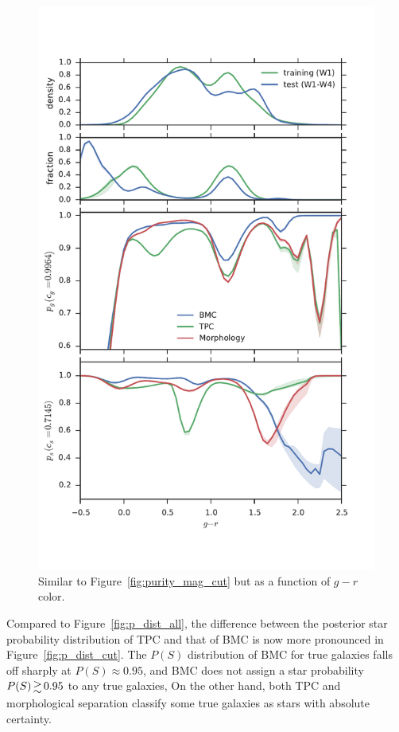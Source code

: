 \documentclass[useAMS,usenatbib]{mn2e}
\begin{document}
\begin{figure}
  \centering
  \includegraphics[width=\columnwidth]{figures/purity_g_r_cut.pdf}
  \caption{Similar to Figure~\ref{fig:purity_mag_cut}
           but as a function of $g-r$ color.}
  \label{fig:purity_g_r_cut}
\end{figure}


Compared to Figure~\ref{fig:p_dist_all},
the difference between the posterior star probability distribution of
TPC and that of BMC is now more pronounced in Figure~\ref{fig:p_dist_cut}.
The $P\left(S\right)$ distribution of BMC for true galaxies
falls off sharply at $P\left(S\right)\approx0.95$,
and BMC does not assign a star probability
$P(S) \ga 0.95$ to any true galaxies,
On the other hand, both TPC and morphological separation 
classify some true galaxies as stars with absolute certainty.
\end{document}
